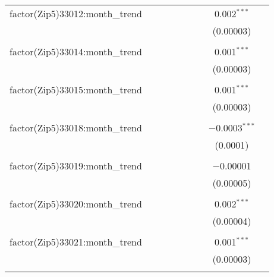 \begin{table}[H]
{\begin{tabular}{@{\extracolsep{5pt}}lcccccccc}
  factor(Zip5)33012:month\_trend &  &  &  &  &  &  & 0.002$^{***}$ &  \\  

   &  &  &  &  &  &  & (0.00003) &  \\  

   & & & & & & & & \\  

  factor(Zip5)33014:month\_trend &  &  &  &  &  &  & 0.001$^{***}$ &  \\  

   &  &  &  &  &  &  & (0.00003) &  \\  

   & & & & & & & & \\  

  factor(Zip5)33015:month\_trend &  &  &  &  &  &  & 0.001$^{***}$ &  \\  

   &  &  &  &  &  &  & (0.00003) &  \\  

   & & & & & & & & \\  

  factor(Zip5)33018:month\_trend &  &  &  &  &  &  & $-$0.0003$^{***}$ &  \\  

   &  &  &  &  &  &  & (0.0001) &  \\  

   & & & & & & & & \\  

  factor(Zip5)33019:month\_trend &  &  &  &  &  &  & $-$0.00001 &  \\  

   &  &  &  &  &  &  & (0.00005) &  \\  

   & & & & & & & & \\  

  factor(Zip5)33020:month\_trend &  &  &  &  &  &  & 0.002$^{***}$ &  \\  

   &  &  &  &  &  &  & (0.00004) &  \\  

   & & & & & & & & \\  

  factor(Zip5)33021:month\_trend &  &  &  &  &  &  & 0.001$^{***}$ &  \\  

   &  &  &  &  &  &  & (0.00003) &  \\  

   & & & & & & & & \\  


\end{tabular}}
\end{table}
